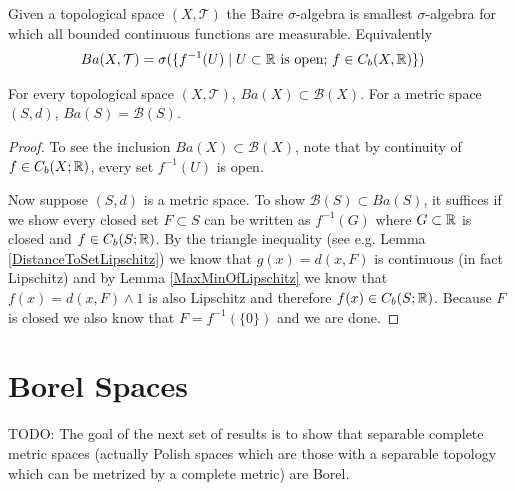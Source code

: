 \begin{defn}Given a topological space $(X, \mathcal{T})$ the Baire
  $\sigma$-algebra is smallest $\sigma$-algebra for which all bounded
  continuous functions are measurable.  Equivalently 
\begin{align*}
Ba(X,\mathcal{T}) &= \sigma(\lbrace f^{-1}(U) \mid U \subset \mathbb{R}
\text{ is open; } f \in C_b(X,\mathbb{R})\rbrace)
\end{align*}
\end{defn}
\begin{lem}For every topological space $(X, \mathcal{T})$, $Ba(X)
  \subset \mathcal{B}(X)$.  For a metric space $(S,d)$, $Ba(S) = \mathcal{B}(S)$.
\end{lem}
\begin{proof}
To see the inclusion $Ba(X)
  \subset \mathcal{B}(X)$, note that by continuity of $f \in
  C_b(X;\mathbb{R})$, every set $f^{-1}(U)$ is open.

Now suppose $(S,d)$ is a metric space.  To show $\mathcal{B}(S)
\subset Ba(S)$, it suffices if we show every closed set $F \subset S$
can be written as $f^{-1}(G)$ where $G \subset \mathbb{R}$ is closed and
$f \in C_b(S; \mathbb{R})$.  By the triangle inequality (see e.g. Lemma
\ref{DistanceToSetLipschitz}) we know
that $g(x) = d(x, F)$ is continuous (in fact Lipschitz) and by Lemma
\ref{MaxMinOfLipschitz} we know that $f(x) = d(x, F) \wedge 1$ is also
Lipschitz and therefore $f(x) \in C_b(S; \mathbb{R})$.  Because $F$ is
closed we also know that $F = f^{-1}(\lbrace 0 \rbrace)$ and we are done.
\end{proof}

\section{Borel Spaces}

TODO: The goal of the next set of results is to show that separable
complete metric spaces (actually Polish spaces which are those with
a separable topology which can be metrized by a complete metric) are Borel.


